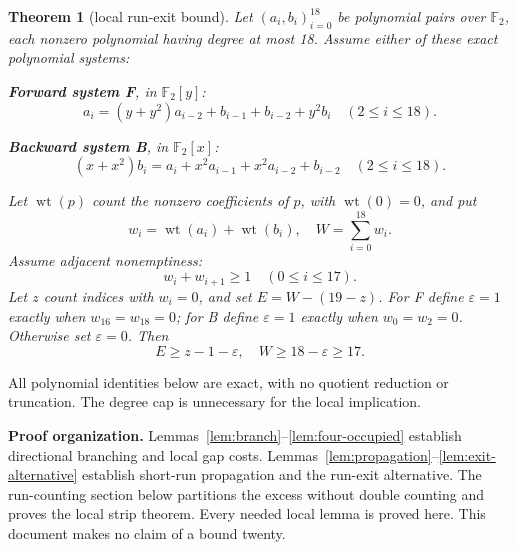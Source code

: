 \documentclass{article}
\newtheorem{theorem}{Theorem}
\DeclareMathOperator{\wt}{wt}
\newcommand{\Ftwo}{\mathbb{F}_2}
\begin{document}
\begin{theorem}[local run-exit bound]\label{thm:run-exit}
  Let \((a_i, b_i)_{i=0}^{18}\) be polynomial pairs over \(\Ftwo\), each nonzero polynomial
  having degree at most 18. Assume either of these exact polynomial systems:

  \textbf{Forward system F}, in \(\Ftwo[y]\):
  \begin{equation}\label{eq:forward}
    a_i = (y + y^2) a_{i-2} + b_{i-1} + b_{i-2} + y^2 b_i
    \quad (2 \le i \le 18).
  \end{equation}

  \textbf{Backward system B}, in \(\Ftwo[x]\):
  \begin{equation}\label{eq:backward}
    (x + x^2) b_i = a_i + x^2 a_{i-1} + x^2 a_{i-2} + b_{i-2}
    \quad (2 \le i \le 18).
  \end{equation}

  Let \(\wt(p)\) count the nonzero coefficients of \(p\), with \(\wt(0) = 0\), and put
  \begin{equation}
    w_i = \wt(a_i) + \wt(b_i), \quad W = \sum_{i=0}^{18} w_i.
  \end{equation}
  Assume adjacent nonemptiness:
  \begin{equation}\label{eq:adjacent}
    w_i + w_{i+1} \ge 1 \quad (0 \le i \le 17).
  \end{equation}
  Let \(z\) count indices with \(w_i = 0\), and set \(E = W - (19 - z)\). For F define
  \(\varepsilon = 1\) exactly when \(w_{16} = w_{18} = 0\); for B define \(\varepsilon = 1\)
  exactly when \(w_0 = w_2 = 0\). Otherwise set \(\varepsilon = 0\). Then
  \begin{equation}\label{eq:main-bound}
    E \ge z - 1 - \varepsilon, \quad W \ge 18 - \varepsilon \ge 17.
  \end{equation}
\end{theorem}

All polynomial identities below are exact, with no quotient reduction or truncation. The
degree cap is unnecessary for the local implication.

\textbf{Proof organization.} Lemmas~\ref{lem:branch}--\ref{lem:four-occupied} establish
directional branching and local gap costs.
Lemmas~\ref{lem:propagation}--\ref{lem:exit-alternative} establish short-run propagation and
the run-exit alternative. The run-counting section below partitions the excess without double
counting and proves the local strip theorem. Every needed local lemma is proved here. This
document makes no claim of a bound twenty.
\end{document}
